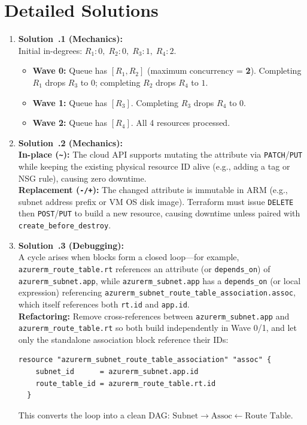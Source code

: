\section{Detailed Solutions}
\begin{enumerate}[leftmargin=18pt]
  \item \textbf{Solution~\thechapter.1 (Mechanics):}\\
  Initial in-degrees: $R_1:0,\; R_2:0,\; R_3:1,\; R_4:2$.
  \begin{itemize}[leftmargin=12pt]
    \item \textbf{Wave 0:} Queue has $[R_1, R_2]$ (maximum concurrency = \textbf{2}). Completing $R_1$ drops $R_3$ to $0$; completing $R_2$ drops $R_4$ to $1$.
    \item \textbf{Wave 1:} Queue has $[R_3]$. Completing $R_3$ drops $R_4$ to $0$.
    \item \textbf{Wave 2:} Queue has $[R_4]$. All 4 resources processed.
  \end{itemize}

  \item \textbf{Solution~\thechapter.2 (Mechanics):}\\
  \textbf{In-place (\texttt{\textasciitilde{}}):} The cloud API supports mutating the attribute via \texttt{PATCH}/\texttt{PUT} while keeping the existing physical resource ID alive (e.g., adding a tag or NSG rule), causing zero downtime.\\
  \textbf{Replacement (\texttt{-/+}):} The changed attribute is immutable in ARM (e.g., subnet address prefix or VM OS disk image). Terraform must issue \texttt{DELETE} then \texttt{POST}/\texttt{PUT} to build a new resource, causing downtime unless paired with \texttt{create\_before\_destroy}.

  \item \textbf{Solution~\thechapter.3 (Debugging):}\\
  A cycle arises when blocks form a closed loop—for example, \texttt{azurerm\_route\_table.rt} references an attribute (or \texttt{depends\_on}) of \texttt{azurerm\_subnet.app}, while \texttt{azurerm\_subnet.app} has a \texttt{depends\_on} (or local expression) referencing \texttt{azurerm\_subnet\_route\_table\_association.assoc}, which itself references both \texttt{rt.id} and \texttt{app.id}.\\
  \textbf{Refactoring:} Remove cross-references between \texttt{azurerm\_subnet.app} and \texttt{azurerm\_route\_table.rt} so both build independently in Wave 0/1, and let only the standalone association block reference their IDs:
  \begin{lstlisting}[language=hcl]
  resource "azurerm_subnet_route_table_association" "assoc" {
    subnet_id      = azurerm_subnet.app.id
    route_table_id = azurerm_route_table.rt.id
  }
  \end{lstlisting}
  This converts the loop into a clean DAG: $\text{Subnet} \to \text{Assoc} \leftarrow \text{Route Table}$.


\end{enumerate}
